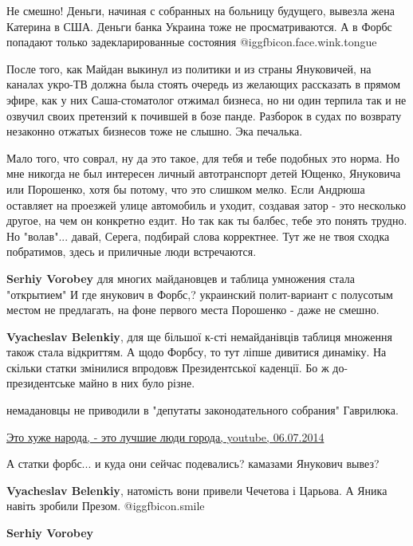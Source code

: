 \begin{itemize}
\begin{itemize}
Не смешно! Деньги, начиная с собранных на больницу будущего, вывезла жена Катерина
в США. Деньги банка Украина тоже не просматриваются. А в Форбс попадают только
задекларированные состояния  @igg{fbicon.face.wink.tongue} 


После того, как Майдан выкинул из политики и из страны Януковичей, на каналах
укро-ТВ должна была стоять очередь из желающих рассказать в прямом эфире, как у
них Саша-стоматолог отжимал бизнеса, но ни один терпила так и не озвучил своих
претензий к почившей в бозе панде. Разборок в судах по возврату незаконно
отжатых бизнесов тоже не слышно. Эка печалька.



Мало того, что соврал, ну да это такое, для тебя и тебе подобных это норма. Но
мне никогда не был интересен личный автотранспорт детей Ющенко, Януковича или
Порошенко, хотя бы потому, что это слишком мелко. Если Андрюша оставляет на
проезжей улице автомобиль и уходит, создавая затор - это несколько другое, на
чем он конкретно ездит. Но так как ты балбес, тебе это понять трудно. Но
"волав"... давай, Серега, подбирай слова корректнее. Тут же не твоя сходка
побратимов, здесь и приличные люди встречаются.

\textbf{Serhiy Vorobey} для многих майдановцев и таблица умножения стала "открытием"
И где янукович в Форбс,? украинский полит-вариант с полусотым местом не предлагать, на фоне первого места Порошенко - даже не смешно.

\textbf{Vyacheslav Belenkiy}, для ще більшої к-сті немайданівців таблиця множення також стала відкриттям.
А щодо Форбсу, то тут ліпше дивитися динаміку. На скільки статки змінилися впродовж Президентської каденції. Бо ж до-президентське майно в них було різне.


немадановцы не приводили в "депутаты законодательного собрания" Гаврилюка. 

\href{https://www.youtube.com/watch?v=W1m-XKGevJc}{%
Это хуже народа, - это лучшие люди города, youtube, 06.07.2014%
}

А статки форбс... и куда они сейчас подевались? камазами Янукович вывез?

\textbf{Vyacheslav Belenkiy}, натомість вони привели Чечетова і Царьова. А Яника навіть зробили Презом.  @igg{fbicon.smile} 

\textbf{Serhiy Vorobey} 


\end{itemize}
\end{itemize}
